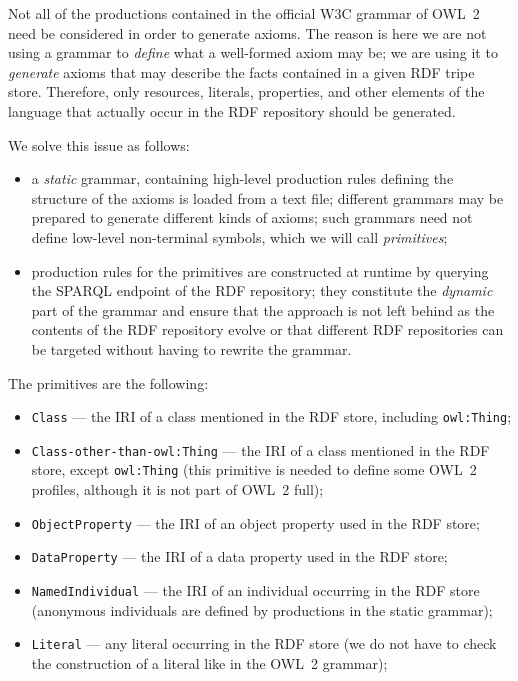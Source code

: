 \documentclass[a4paper]{article}
\newcounter{ex}
\begin{document}
Not all of the productions contained in the official W3C grammar of OWL~2 need be
considered in order to generate axioms. The reason is here we are not using a grammar
to \emph{define} what a well-formed axiom may be; we are using it to \emph{generate}
axioms that may describe the facts contained in a given RDF tripe store. Therefore,
only resources, literals, properties, and other elements of the language that actually
occur in the RDF repository should be generated.

We solve this issue as follows:
\begin{itemize}
\item a \emph{static} grammar, containing high-level production rules defining the
  structure of the axioms is loaded from a text file; different grammars may be
  prepared to generate different kinds of axioms; such grammars need not define
  low-level non-terminal symbols, which we will call \emph{primitives};
\item production rules for the primitives are constructed at runtime by querying
  the SPARQL endpoint of the RDF repository; they constitute the \emph{dynamic}
  part of the grammar and ensure that the approach is not left behind as the
  contents of the RDF repository evolve or that different RDF repositories can
  be targeted without having to rewrite the grammar.
\end{itemize}
The primitives are the following:
\begin{itemize}
\item \texttt{Class} --- the IRI of a class mentioned in the RDF store,
  including \texttt{owl:Thing};
\item \texttt{Class-other-than-owl:Thing} --- the IRI of a class mentioned
  in the RDF store, except \texttt{owl:Thing} (this primitive is needed to define
  some OWL~2 profiles, although it is not part of OWL~2 full);
\item \texttt{ObjectProperty} --- the IRI of an object property used in the
  RDF store;
\item \texttt{DataProperty} --- the IRI of a data property used in the RDF store;
\item \texttt{NamedIndividual} --- the IRI of an individual occurring in the RDF store
  (anonymous individuals are defined by productions in the static grammar);
\item \texttt{Literal} --- any literal occurring in the RDF store
  (we do not have to check the construction of a literal like in the OWL~2 grammar);
\end{itemize}
\end{document}
